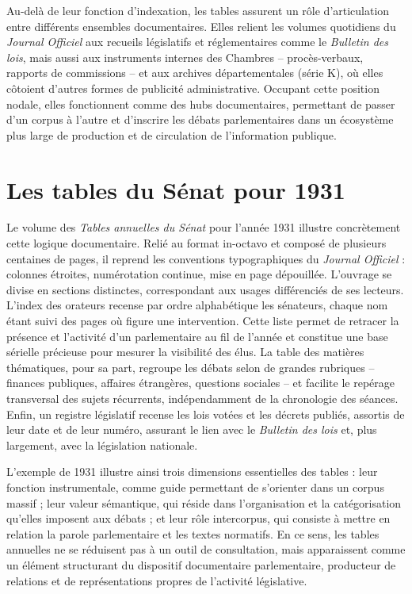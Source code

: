 Au-delà de leur fonction d’indexation, les tables assurent un rôle d’articulation entre différents ensembles documentaires. Elles relient les volumes quotidiens du \emph{Journal Officiel} aux recueils législatifs et réglementaires comme le \emph{Bulletin des lois}, mais aussi aux instruments internes des Chambres – procès-verbaux, rapports de commissions – et aux archives départementales (série K), où elles côtoient d’autres formes de publicité administrative. Occupant cette position nodale, elles fonctionnent comme des hubs documentaires, permettant de passer d’un corpus à l’autre et d’inscrire les débats parlementaires dans un écosystème plus large de production et de circulation de l’information publique.

\section{Les tables du Sénat pour 1931}

Le volume des \emph{Tables annuelles du Sénat} pour l’année 1931 illustre concrètement cette logique documentaire. Relié au format in-octavo et composé de plusieurs centaines de pages, il reprend les conventions typographiques du \emph{Journal Officiel} : colonnes étroites, numérotation continue, mise en page dépouillée. L’ouvrage se divise en sections distinctes, correspondant aux usages différenciés de ses lecteurs. L’index des orateurs recense par ordre alphabétique les sénateurs, chaque nom étant suivi des pages où figure une intervention. Cette liste permet de retracer la présence et l’activité d’un parlementaire au fil de l’année et constitue une base sérielle précieuse pour mesurer la visibilité des élus. La table des matières thématiques, pour sa part, regroupe les débats selon de grandes rubriques – finances publiques, affaires étrangères, questions sociales – et facilite le repérage transversal des sujets récurrents, indépendamment de la chronologie des séances. Enfin, un registre législatif recense les lois votées et les décrets publiés, assortis de leur date et de leur numéro, assurant le lien avec le \emph{Bulletin des lois} et, plus largement, avec la législation nationale.

L’exemple de 1931 illustre ainsi trois dimensions essentielles des tables : leur fonction instrumentale, comme guide permettant de s’orienter dans un corpus massif ; leur valeur sémantique, qui réside dans l’organisation et la catégorisation qu’elles imposent aux débats ; et leur rôle intercorpus, qui consiste à mettre en relation la parole parlementaire et les textes normatifs. En ce sens, les tables annuelles ne se réduisent pas à un outil de consultation, mais apparaissent comme un élément structurant du dispositif documentaire parlementaire, producteur de relations et de représentations propres de l’activité législative.
